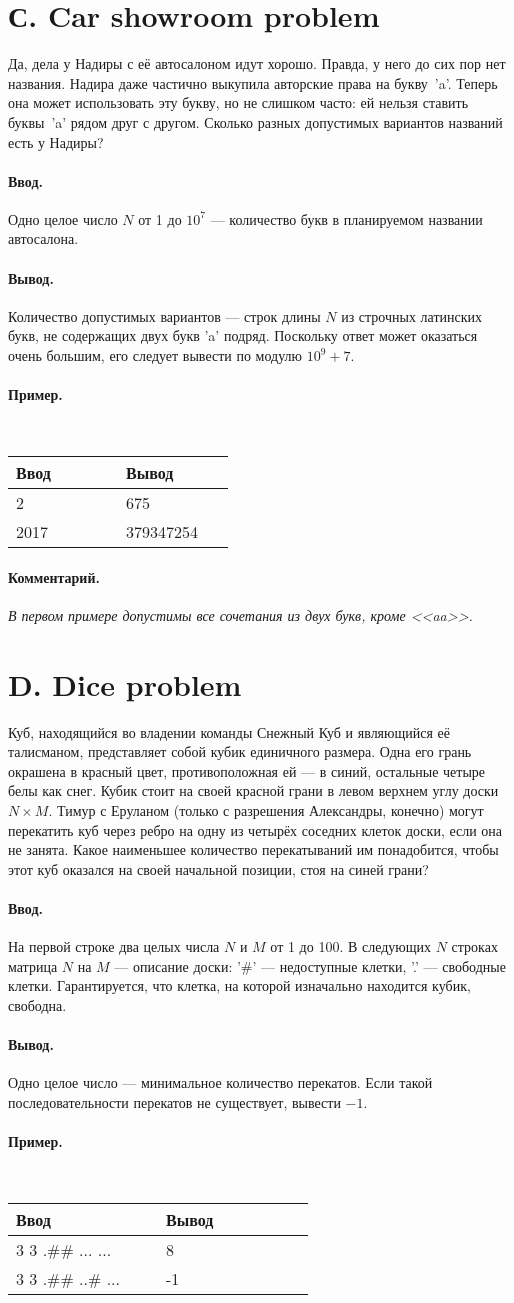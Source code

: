 \documentclass[10pt, a5paper]{article}
\newcommand{\informat}[1]
{
	\paragraph{Ввод.\\} #1
}
\newcommand{\outformat}[1]
{
	\paragraph{Вывод.\\} #1
}
\newcommand{\examplee}[4]
{
	\paragraph{Пример.\\}
	{\tt
	\begin{tabular}{|p{0.4\linewidth}|p{0.4\linewidth}|}
	\hline
	Ввод 	& Вывод  	\\
	\hline
	#1 		& #2 		\\
	\hline
	#3		& #4		\\
	\hline
	\end{tabular}
	}
}
\newcommand{\excomm}[1]
{
	\paragraph{Комментарий. \\}
	\textit{#1}
}
\begin{document}
\section*{С. Car showroom problem}


Да, дела у Надиры с её автосалоном идут хорошо. Правда, у него до сих пор нет названия. Надира даже частично выкупила авторские права на букву~'a'. Теперь она может использовать эту букву, но не слишком часто: ей нельзя ставить буквы~'a' рядом друг с другом. Сколько разных допустимых вариантов названий есть у Надиры?

\informat{Одно целое число $N$ от 1 до $10^7$ --- количество букв в планируемом названии автосалона.}
 
\outformat{Количество допустимых вариантов --- строк длины $N$ из строчных латинских букв, не содержащих двух букв 'a' подряд. Поскольку ответ может оказаться очень большим, его следует вывести по модулю $10^9 + 7$.}
 
\examplee{2}{675}{2017}{379347254}
 
\excomm{В первом примере допустимы все сочетания из двух букв, кроме <<aa>>.}


 
\section*{D. Dice problem}


Куб, находящийся во владении команды Снежный Куб и являющийся её талисманом, представляет собой кубик единичного размера. Одна его грань окрашена в красный цвет, противоположная ей --- в синий, остальные четыре белы как снег. Кубик стоит на своей красной грани в левом верхнем углу доски $N \times M$. Тимур с Еруланом (только с разрешения Александры, конечно) могут перекатить куб через ребро на одну из четырёх соседних клеток доски, если она не занята. Какое наименьшее количество перекатываний им понадобится, чтобы этот куб оказался на своей начальной позиции, стоя на синей грани?

\informat{На первой строке два целых числа $N$ и $M$ от 1 до 100. В следующих $N$ строках матрица $N$ на $M$ --- описание доски: '\#' --- недоступные клетки, '.' --- свободные клетки. Гарантируется, что клетка, на которой изначально находится кубик, свободна.}
 
\outformat{Одно целое число --- минимальное количество перекатов. Если такой по\-сле\-до\-ва\-тель\-нос\-ти перекатов не существует, вывести $-1$.}

\examplee{3 3 \newline
.\#\# \newline
...\newline
...}
{8}
{3 3 \newline
.\#\# \newline
..\#\newline
...}
{-1}
\end{document}
